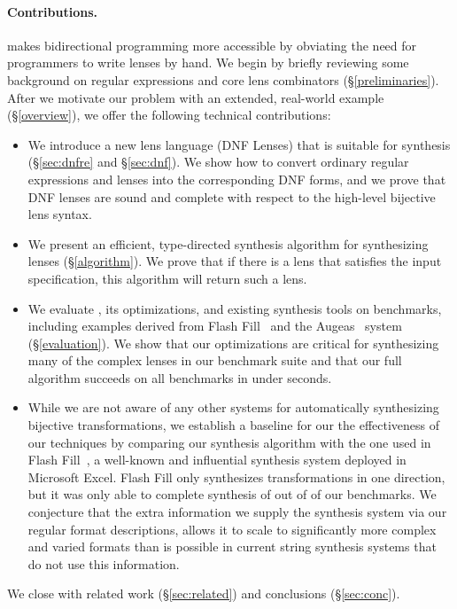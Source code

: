 \documentclass[acmsmall,screen]{acmart}
\begin{document}
\paragraph*{Contributions.}  \Optician{} makes
bidirectional programming more accessible by obviating the need for
programmers to write lenses by hand.
We begin by briefly reviewing some background on regular expressions and core
lens combinators (\S\ref{preliminaries}).
After we motivate our problem
with an extended, real-world example (\S\ref{overview}),
we offer the following technical contributions:

\begin{itemize}
\item 
  We introduce a new lens language (DNF Lenses) that is suitable for synthesis
  (\S\ref{sec:dnfre} and \S\ref{sec:dnf}).  
  We show how to convert ordinary regular expressions and lenses
  into the corresponding DNF forms, and we prove that DNF lenses are sound
  and complete with respect to the high-level bijective lens syntax.

\item
  We present an efficient, type-directed synthesis algorithm for
  synthesizing lenses (\S\ref{algorithm}).  We prove that if there is a lens
  that satisfies the input specification, this algorithm will return such a lens.

\item
  We evaluate \Optician{}, its optimizations, and
  existing synthesis tools on \BenchmarkCount benchmarks, including
  examples derived from Flash Fill~\cite{gulwani-popl-2014} and the
  Augeas~\cite{augeas} system (\S \ref{evaluation}).  
  We show that our optimizations are critical for synthesizing many of
  the complex lenses in our benchmark suite and that our full
  algorithm succeeds on all benchmarks in under \SynthesizedUnder
  seconds.  

\item While we are not aware of any other systems for automatically
 synthesizing bijective transformations, we establish a baseline for
 our the effectiveness of our techniques by comparing our synthesis algorithm
 with the one used in Flash Fill~\cite{gulwani-popl-2014}, a well-known
 and influential synthesis system deployed in Microsoft Excel.  Flash Fill only
 synthesizes transformations in one direction, but it was only able to
 complete synthesis of \FlashFillSuccesses{} out of \BenchmarkCount of our benchmarks.  We conjecture
 that the extra information we supply the synthesis system via our 
 regular format descriptions, allows it to scale to significantly more
 complex and varied formats than is possible in 
 current string synthesis systems that do not use this information.
\end{itemize} We close with related work
(\S \ref{sec:related}) and conclusions (\S \ref{sec:conc}).
\end{document}
